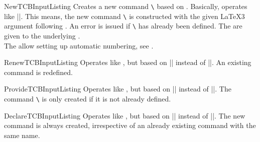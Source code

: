 \begin{docCommand}{NewTCBInputListing}{}
  Creates a new command \texttt{\textbackslash} based on .
  Basically,  operates like |\NewDocumentCommand|. This means,
  the new command \texttt{\textbackslash} is constructed with the
  given \LaTeX3 argument  following \cite{latexproject:usrguide}.
  An error is issued if \texttt{\textbackslash} has already been defined.
  The  are given to the underlying .\\
  The  allow setting up automatic numbering,
  see .

\begin{dispExample}

\end{dispExample}
  \end{docCommand}

\begin{docCommand}{RenewTCBInputListing}{}
  Operates like , but based on |\RenewDocumentCommand| instead of |\NewDocumentCommand|.
  An existing command is redefined.
\end{docCommand}

\begin{docCommand}{ProvideTCBInputListing}{}
  Operates like , but based on |\ProvideDocumentCommand| instead of |\NewDocumentCommand|.
  The command \texttt{\textbackslash} is only created if it is not already defined.
\end{docCommand}

\begin{docCommand}{DeclareTCBInputListing}{}
  Operates like , but based on |\DeclareDocumentCommand| instead of |\NewDocumentCommand|.
  The new command is always created, irrespective of an already existing
  command with the same name.
\end{docCommand}



